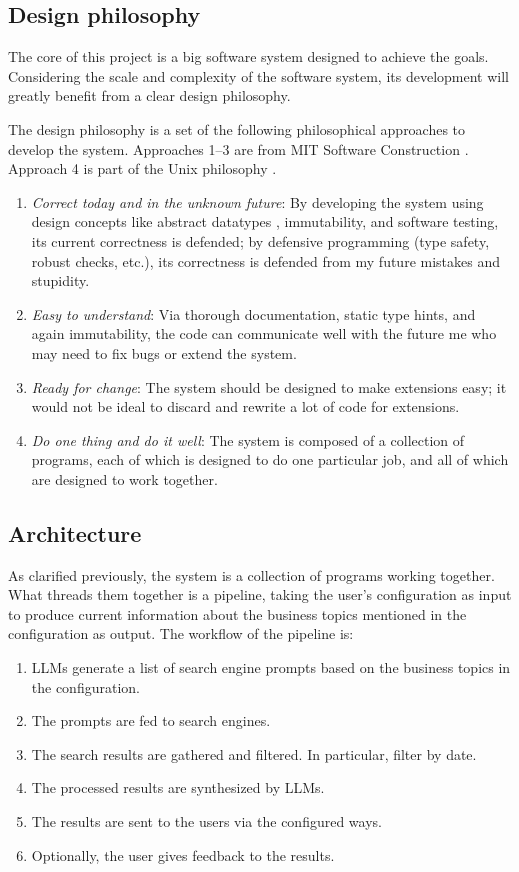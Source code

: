 \documentclass[final-report]{report-template}
\begin{document}
\subsection{Design philosophy} \label{sec.design.philo}
The core of this project is a big software system designed to achieve the
goals. Considering the scale and complexity of the software system, its
development will greatly benefit from a clear design philosophy.

The design philosophy is a set of the following philosophical approaches
to develop the system. Approaches 1--3 are from MIT Software Construction
\cite{mit.software.construction}. Approach 4 is part of the Unix
philosophy \cite{unix.philosophy}.

\begin{enumerate}
	\item 
	\emph{Correct today and in the unknown future}: By developing the
	system using design concepts like abstract datatypes \cite{adt},
	immutability, and software testing, its current correctness is defended;
	by defensive programming (type safety, robust checks, etc.), its
	correctness is defended from my future mistakes and stupidity.
	\item 
	\emph{Easy to understand}: Via thorough documentation, static type hints,
	and again immutability, the code can communicate well with the future me
	who may need to fix bugs or extend the system.
	\item
	\emph{Ready for change}: The system should be designed to make extensions
	easy; it would not be ideal to discard and rewrite a lot of code for
	extensions. 
	\item
	\emph{Do one thing and do it well}: The system is composed of a collection
	of programs, each of which is designed to do one particular job, and all of
	which are designed to work together.
\end{enumerate}

\subsection{Architecture}
As clarified previously, the system is a collection of programs working
together. What threads them together is a pipeline, taking the user's
configuration as input to produce current information about the business topics
mentioned in the configuration as output. The workflow of the pipeline is:
\begin{enumerate}
	\item LLMs generate a list of search engine prompts based on the business topics
		in the configuration.
	\item The prompts are fed to search engines.	
	\item The search results are gathered and filtered. In particular, filter
		by date.	
	\item The processed results are synthesized by LLMs.
	\item The results are sent to the users via the configured ways.
	\item Optionally, the user gives feedback to the results. 
\end{enumerate}
\end{document}
